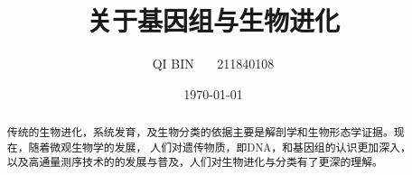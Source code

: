 \documentclass[UTF8]{ctexart}
\begin{document}
\title{\textbf{关于基因组与生物进化}}
\author{QI BIN \ \ \ 211840108}
\date{\today}
\linespread{1.5}

\renewcommand{\abstractname}{\Large\textbf{摘要}}
\maketitle

\setcounter{page}{0}
\maketitle
\thispagestyle{empty}

\begin{abstract}
传统的生物进化，系统发育，及生物分类的依据主要是解剖学和生物形态学证据。现在，随着微观生物学的发展， 人们对遗传物质，即DNA，和基因组的认识更加深入，以及高通量测序技术的的发展与普及，人们对生物进化与分类有了更深的理解。
    
\end{abstract}
\end{document}
